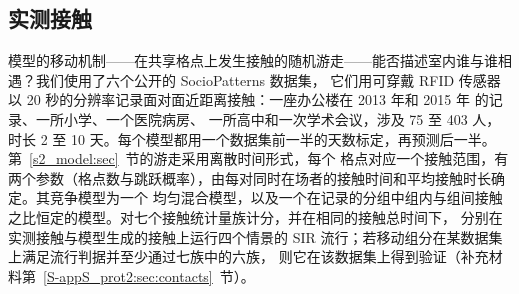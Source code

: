 \subsection{实测接触}\label{s8b_evidence:sec:contacts}

模型的移动机制——在共享格点上发生接触的随机游走——能否描述室内谁与谁相遇？我们使用了六个公开的 SocioPatterns 数据集，
它们用可穿戴 RFID 传感器以 20 秒的分辨率记录面对面近距离接触\citep{cattuto2010dynamics}：一座办公楼在 2013 年和 2015 年
的记录\citep{genois2015data,genois2018can}、一所小学\citep{stehle2011high}、一个医院病房\citep{vanhems2013estimating}、
一所高中\citep{mastrandrea2015contact}和一次学术会议\citep{genois2018can,stehle2011simulation}，涉及 75 至 403 人，时长
2 至 10 天。每个模型都用一个数据集前一半的天数标定，再预测后一半。第~\ref{s2_model:sec}~节的游走采用离散时间形式，每个
格点对应一个接触范围，有两个参数（格点数与跳跃概率），由每对同时在场者的接触时间和平均接触时长确定。其竞争模型为一个
均匀混合模型，以及一个在记录的分组中组内与组间接触之比恒定的模型。对七个接触统计量族计分，并在相同的接触总时间下，
分别在实测接触与模型生成的接触上运行四个情景的 SIR 流行；若移动组分在某数据集上满足流行判据并至少通过七族中的六族，
则它在该数据集上得到验证（补充材料第~\ref{S-appS_prot2:sec:contacts}~节）。

